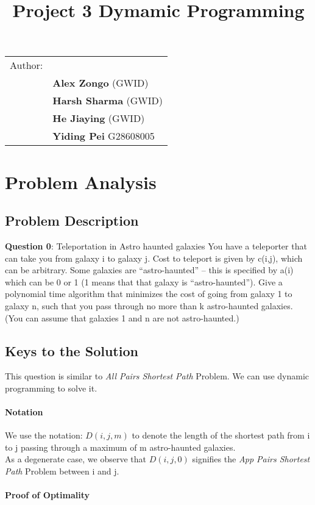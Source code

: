 \documentclass{article}
\title{
	Project 3 Dymamic Programming
}
\begin{document}
\maketitle

\noindent\begin{tabular}{@{}ll}
    Author:\\ & \textbf{Alex Zongo} (GWID)\\ & \textbf{Harsh Sharma} (GWID)\\ & \textbf{He Jiaying} (GWID)\\ & \textbf{Yiding Pei} G28608005 
\end{tabular}

\section{Problem Analysis}
\subsection{Problem Description}
    \textbf{Question 0}: Teleportation in Astro haunted galaxies
    \noindent
    \newline
    You have a teleporter that can take you from galaxy i to galaxy j. Cost to teleport is given by c(i,j), which can be arbitrary. Some galaxies are “astro-haunted” – this is specified by a(i) which can be 0 or 1 (1 means that that galaxy is “astro-haunted”). Give a polynomial time algorithm that minimizes the cost of going from galaxy 1 to galaxy n, such that you pass through no more than k astro-haunted galaxies. (You can assume that galaxies 1 and n are not astro-haunted.)
\subsection{Keys to the Solution}
    This question is similar to \textit{All Pairs Shortest Path} Problem. We can use dynamic programming to solve it.
\paragraph{Notation}
    We use the notation: $D(i,j,m)$ to denote the length of the shortest path from i to j passing through a maximum of m astro-haunted galaxies. \\
    As a degenerate case, we observe that $D(i,j,0)$ signifies the \textit{App Pairs Shortest Path} Problem between i and j.
\paragraph{Proof of Optimality}
\end{document}
